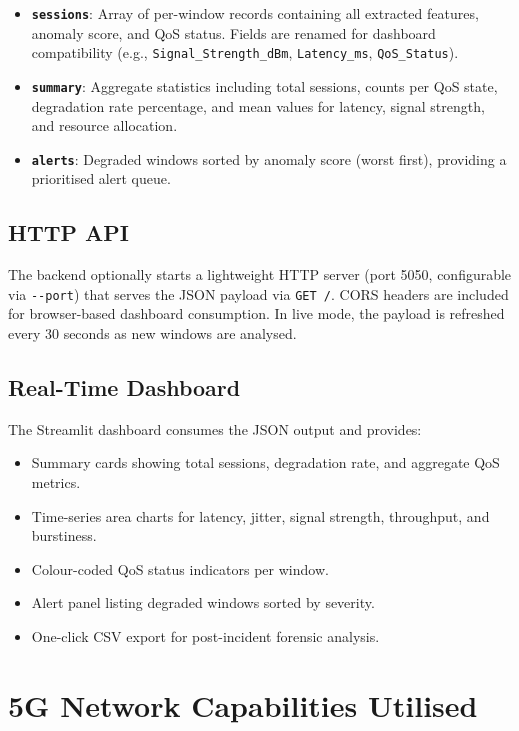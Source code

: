 \documentclass[11pt, a4paper]{article}
\begin{document}
\begin{itemize}
    \item \textbf{\texttt{sessions}}: Array of per-window records containing all extracted features, anomaly score, and QoS status. Fields are renamed for dashboard compatibility (e.g., \texttt{Signal\_Strength\_dBm}, \texttt{Latency\_ms}, \texttt{QoS\_Status}).
    \item \textbf{\texttt{summary}}: Aggregate statistics including total sessions, counts per QoS state, degradation rate percentage, and mean values for latency, signal strength, and resource allocation.
    \item \textbf{\texttt{alerts}}: Degraded windows sorted by anomaly score (worst first), providing a prioritised alert queue.
\end{itemize}

\subsection{HTTP API}

The backend optionally starts a lightweight HTTP server (port 5050, configurable via \texttt{-{}-port}) that serves the JSON payload via \texttt{GET /}. CORS headers are included for browser-based dashboard consumption. In live mode, the payload is refreshed every 30 seconds as new windows are analysed.

\subsection{Real-Time Dashboard}

The Streamlit dashboard consumes the JSON output and provides:

\begin{itemize}
    \item Summary cards showing total sessions, degradation rate, and aggregate QoS metrics.
    \item Time-series area charts for latency, jitter, signal strength, throughput, and burstiness.
    \item Colour-coded QoS status indicators per window.
    \item Alert panel listing degraded windows sorted by severity.
    \item One-click CSV export for post-incident forensic analysis.
\end{itemize}

\section{5G Network Capabilities Utilised}
\end{document}
